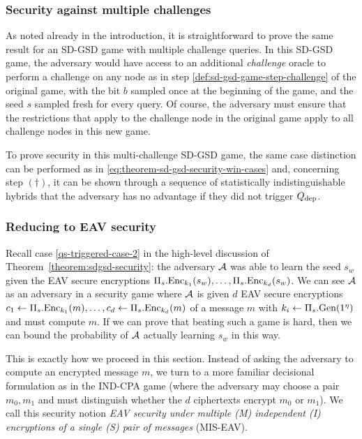 \subsubsection{Security against multiple challenges} \label{sec:sd-gsd-multi-challenge-security}
As noted already in the introduction, it is straightforward to prove the same result for an SD-GSD game with multiple challenge queries. In this SD-GSD game, the adversary would have access to an additional \emph{challenge} oracle to perform a challenge on any node as in step \ref{def:sd-gsd-game-step-challenge} of the original game, with the bit $b$ sampled once at the beginning of the game, and the seed $s$ sampled fresh for every query. Of course, the adversary must ensure that the restrictions that apply to the challenge node in the original game apply to all challenge nodes in this new game.

To prove security in this multi-challenge SD-GSD game, the same case distinction can be performed as in \eqref{eq:theorem-sd-gsd-security-win-cases} and, concerning step $(\dagger)$, it can be shown through a sequence of statistically indistinguishable hybrids that the adversary has no advantage if they did not trigger $Q_\mathrm{dep}$.

\subsubsection{Reducing to EAV security}

Recall case \ref{qs-triggered-case-2} in the high-level discussion of Theorem~\ref{theorem:sdgsd-security}: the adversary $\mathcal{A}$ was able to learn the seed $s_w$ given the EAV secure encryptions $\Pi_s.\mathrm{Enc}_{k_1}(s_w), \ldots, \Pi_s.\mathrm{Enc}_{k_d}(s_w)$. We can see $\mathcal{A}$ as an adversary in a security game where $\mathcal{A}$ is given $d$ EAV secure encryptions $c_1 \leftarrow \Pi_s.\mathrm{Enc}_{k_1}(m), \ldots, c_d \leftarrow \Pi_s.\mathrm{Enc}_{k_d}(m)$ of a message $m$ with $k_i \leftarrow \Pi_s.\mathrm{Gen}(1^\eta)$ and must compute $m$. If we can prove that beating such a game is hard, then we can bound the probability of $\mathcal{A}$ actually learning $s_w$ in this way.

This is exactly how we proceed in this section. Instead of asking the adversary to compute an encrypted message $m$, we turn to a more familiar decisional formulation as in the IND-CPA game (where the adversary may choose a pair $m_0, m_1$ and must distinguish whether the $d$ ciphertexts encrypt $m_0$ or $m_1$). We call this security notion \emph{EAV security under multiple (M) independent (I) encryptions of a single (S) pair of messages} (MIS-EAV).

